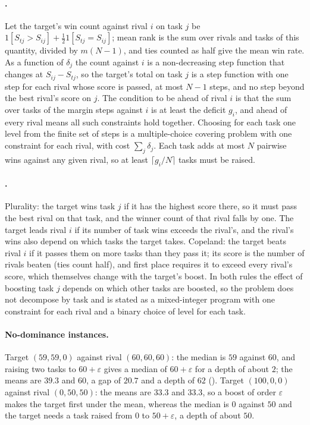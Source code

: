 \paragraph{.}
Let the target's win count against rival $i$ on task $j$ be $1[S_{tj}>S_{ij}]+\tfrac12 1[S_{tj}=S_{ij}]$; mean rank is the sum over rivals and tasks of this quantity, divided by $m(N-1)$, and ties counted as half give the mean win rate. As a function of $\delta_j$ the count against $i$ is a non-decreasing step function that changes at $S_{ij}-S_{tj}$, so the target's total on task $j$ is a step function with one step for each rival whose score is passed, at most $N-1$ steps, and no step beyond the best rival's score on $j$. The condition to be ahead of rival $i$ is that the sum over tasks of the margin steps against $i$ is at least the deficit $g_i$, and ahead of every rival means all such constraints hold together. Choosing for each task one level from the finite set of steps is a multiple-choice covering problem with one constraint for each rival, with cost $\sum_j\delta_j$. Each task adds at most $N$ pairwise wins against any given rival, so at least $\lceil g_i/N\rceil$ tasks must be raised.

\paragraph{.}
Plurality: the target wins task $j$ if it has the highest score there, so it must pass the best rival on that task, and the winner count of that rival falls by one. The target leads rival $i$ if its number of task wins exceeds the rival's, and the rival's wins also depend on which tasks the target takes. Copeland: the target beats rival $i$ if it passes them on more tasks than they pass it; its score is the number of rivals beaten (ties count half), and first place requires it to exceed every rival's score, which themselves change with the target's boost. In both rules the effect of boosting task $j$ depends on which other tasks are boosted, so the problem does not decompose by task and is stated as a mixed-integer program with one constraint for each rival and a binary choice of level for each task.

\paragraph{No-dominance instances.}
Target $(59,59,0)$ against rival $(60,60,60)$: the median is $59$ against $60$, and raising two tasks to $60+\varepsilon$ gives a median of $60+\varepsilon$ for a depth of about $2$; the means are $39.3$ and $60$, a gap of $20.7$ and a depth of $62$ (). Target $(100,0,0)$ against rival $(0,50,50)$: the means are $33.3$ and $33.3$, so a boost of order $\varepsilon$ makes the target first under the mean, whereas the median is $0$ against $50$ and the target needs a task raised from $0$ to $50+\varepsilon$, a depth of about $50$.

